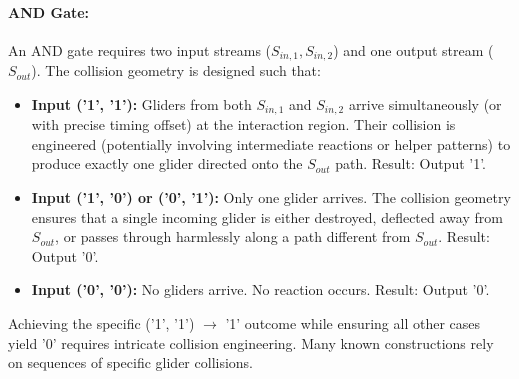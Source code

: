 \documentclass{article}
\theoremstyle{definition}
\theoremstyle{plain}
\theoremstyle{plain}
\begin{document}
\paragraph{AND Gate:} An AND gate requires two input streams ($S_{in,1}, S_{in,2}$) and one output stream ($S_{out}$). The collision geometry is designed such that:
\begin{itemize}
  \item \textbf{Input ('1', '1'):} Gliders from both $S_{in,1}$ and $S_{in,2}$ arrive simultaneously (or with precise timing offset) at the interaction region. Their collision is engineered (potentially involving intermediate reactions or helper patterns) to produce exactly one glider directed onto the $S_{out}$ path. Result: Output '1'.
  \item \textbf{Input ('1', '0') or ('0', '1'):} Only one glider arrives. The collision geometry ensures that a single incoming glider is either destroyed, deflected away from $S_{out}$, or passes through harmlessly along a path different from $S_{out}$. Result: Output '0'.
  \item \textbf{Input ('0', '0'):} No gliders arrive. No reaction occurs. Result: Output '0'.
\end{itemize}
Achieving the specific ('1', '1') $\to$ '1' outcome while ensuring all other cases yield '0' requires intricate collision engineering. Many known constructions rely on sequences of specific glider collisions.
\end{document}

